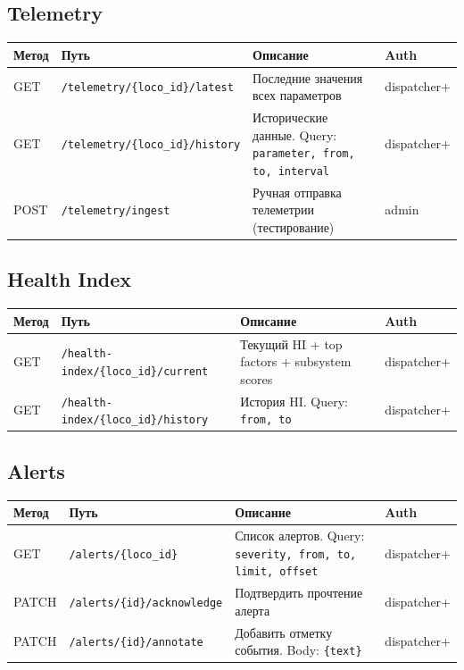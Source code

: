 \documentclass[12pt,a4paper]{article}
\newcommand{\code}[1]{\texttt{#1}}
\begin{document}
\subsection{Telemetry}

\begin{tabularx}{\textwidth}{l l X l}
\toprule
\textbf{Метод} & \textbf{Путь} & \textbf{Описание} & \textbf{Auth} \\
\midrule
GET & \code{/telemetry/\{loco\_id\}/latest} & Последние значения всех параметров & dispatcher+ \\
GET & \code{/telemetry/\{loco\_id\}/history} & Исторические данные. Query: \code{parameter, from, to, interval} & dispatcher+ \\
POST & \code{/telemetry/ingest} & Ручная отправка телеметрии (тестирование) & admin \\
\bottomrule
\end{tabularx}

\subsection{Health Index}

\begin{tabularx}{\textwidth}{l l X l}
\toprule
\textbf{Метод} & \textbf{Путь} & \textbf{Описание} & \textbf{Auth} \\
\midrule
GET & \code{/health-index/\{loco\_id\}/current} & Текущий HI + top factors + subsystem scores & dispatcher+ \\
GET & \code{/health-index/\{loco\_id\}/history} & История HI. Query: \code{from, to} & dispatcher+ \\
\bottomrule
\end{tabularx}

\subsection{Alerts}

\begin{tabularx}{\textwidth}{l l X l}
\toprule
\textbf{Метод} & \textbf{Путь} & \textbf{Описание} & \textbf{Auth} \\
\midrule
GET & \code{/alerts/\{loco\_id\}} & Список алертов. Query: \code{severity, from, to, limit, offset} & dispatcher+ \\
PATCH & \code{/alerts/\{id\}/acknowledge} & Подтвердить прочтение алерта & dispatcher+ \\
PATCH & \code{/alerts/\{id\}/annotate} & Добавить отметку события. Body: \code{\{text\}} & dispatcher+ \\
\bottomrule
\end{tabularx}
\end{document}
